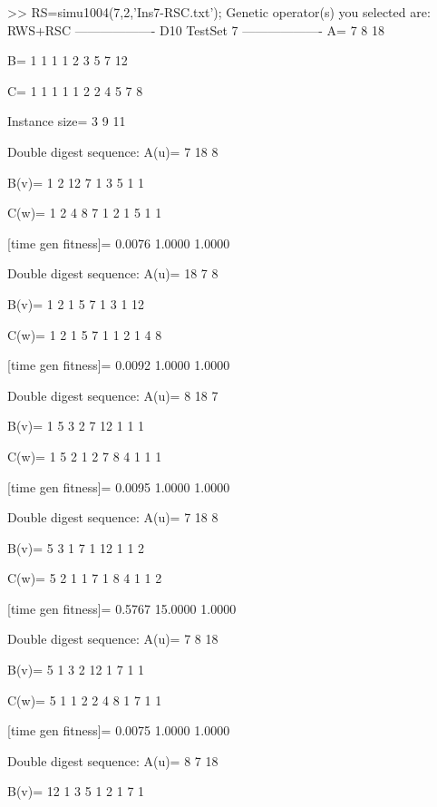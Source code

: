 >> RS=simu1004(7,2,'Ins7-RSC.txt');
Genetic operator(s) you selected are:
RWS+RSC
------------------- D10 TestSet 7 -------------------
A=
     7     8    18

B=
     1     1     1     1     2     3     5     7    12

C=
     1     1     1     1     1     2     2     4     5     7     8

Instance size=
     3     9    11

Double digest sequence:
A(u)=
     7    18     8

B(v)=
     1     2    12     7     1     3     5     1     1

C(w)=
     1     2     4     8     7     1     2     1     5     1     1

[time gen fitness]=
    0.0076    1.0000    1.0000

Double digest sequence:
A(u)=
    18     7     8

B(v)=
     1     2     1     5     7     1     3     1    12

C(w)=
     1     2     1     5     7     1     1     2     1     4     8

[time gen fitness]=
    0.0092    1.0000    1.0000

Double digest sequence:
A(u)=
     8    18     7

B(v)=
     1     5     3     2     7    12     1     1     1

C(w)=
     1     5     2     1     2     7     8     4     1     1     1

[time gen fitness]=
    0.0095    1.0000    1.0000

Double digest sequence:
A(u)=
     7    18     8

B(v)=
     5     3     1     7     1    12     1     1     2

C(w)=
     5     2     1     1     7     1     8     4     1     1     2

[time gen fitness]=
    0.5767   15.0000    1.0000

Double digest sequence:
A(u)=
     7     8    18

B(v)=
     5     1     3     2    12     1     7     1     1

C(w)=
     5     1     1     2     2     4     8     1     7     1     1

[time gen fitness]=
    0.0075    1.0000    1.0000

Double digest sequence:
A(u)=
     8     7    18

B(v)=
    12     1     3     5     1     2     1     7     1

